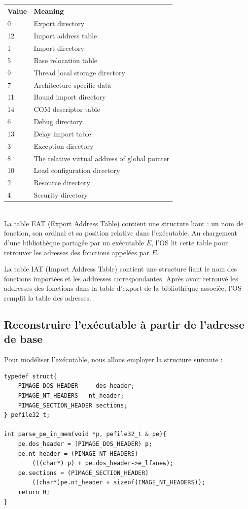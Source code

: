 \documentclass{book}
\newenvironment{commentaire}[1]{%
	\def\FrameCommand{\fboxrule=\FrameRule\fboxsep=\FrameSep \fcolorbox{yellow!50}{yellow!10}}%
	\MakeFramed {\advance\hsize-\width \FrameRestore}
	\noindent {\bf #1}\\
}%
{\endMakeFramed}
\begin{document}
\bigskip
\begin{tabular}{| l | l |}
	\hline
Value	&Meaning \\
\hline
0 & Export directory\\
12&Import address table\\
1&Import directory \\
5 &Base relocation table\\
9 & Thread local storage directory\\
7 &Architecture-specific data \\
11&Bound import directory\\
14&COM descriptor table\\
6&Debug directory\\
13&Delay import table\\
3 &Exception directory \\
8 & The relative virtual address of global pointer\\
10 &Load configuration directory\\
2 & Resource directory \\
4& Security directory \\
\hline
\end{tabular}


\begin{commentaire}{En bref}
La table EAT (Export Address Table) contient une structure liant : un nom de fonction, son ordinal et sa position relative dans l'exécutable. Au chargement d'une bibliothèque partagée par un exécutable $E$, l'OS lit cette table pour retrouver les adresses des fonctions appelées par $E$.



La table IAT (Import Address Table) contient une structure liant le nom des fonctions importées et les addresses correspondantes. Après avoir retrouvé les addresses des fonctions dans la table d'export de la bibliothèque associée, l'OS remplit la table des adresses.  
\end{commentaire}

\subsection{Reconstruire l'exécutable à partir de l'adresse de base}

Pour modéliser l'exécutable, nous allons employer la structure suivante : 

\begin{verbatim}
typedef struct{
	PIMAGE_DOS_HEADER     dos_header;
	PIMAGE_NT_HEADERS   nt_header;
	PIMAGE_SECTION_HEADER sections;
} pefile32_t;

int parse_pe_in_mem(void *p, pefile32_t & pe){
	pe.dos_header = (PIMAGE_DOS_HEADER) p;
	pe.nt_header = (PIMAGE_NT_HEADERS) 
		(((char*) p) + pe.dos_header->e_lfanew);
	pe.sections = (PIMAGE_SECTION_HEADER) 
		((char*)pe.nt_header + sizeof(IMAGE_NT_HEADERS));
	return 0;
}
\end{verbatim}
\end{document}
